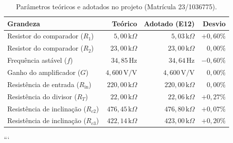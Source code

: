 \documentclass[11pt,a4paper]{article}
\begin{document}
\begin{table}[H]
\centering
\caption{Parâmetros teóricos e adotados no projeto (Matrícula 23/1036775).}
\label{tab:projeto_daniel}
\renewcommand{\arraystretch}{1.3}
\begin{tabular}{@{}lrrr@{}}
\toprule
\textbf{Grandeza} &
\textbf{Teórico} &
\textbf{Adotado (E12)} &
\textbf{Desvio}\\
\midrule
Resistor do comparador ($R_1$) &
$5{,}00\,\text{k}\Omega$ &
$5{,}03\,\text{k}\Omega$ &
$+0{,}60\%$\\

Resistor do comparador ($R_2$) &
$23{,}00\,\text{k}\Omega$ &
$23{,}00\,\text{k}\Omega$ &
$0{,}00\%$\\

Frequência astável ($f$) &
$34{,}85\,\text{Hz}$ &
$34{,}64\,\text{Hz}$ &
$-0{,}60\%$\\

Ganho do amplificador ($G$) &
$4{,}600\,\text{V/V}$ &
$4{,}600\,\text{V/V}$ &
$0{,}00\%$\\

Resistência de entrada ($R_{\text{in}}$) &
$220{,}00\,\text{k}\Omega$ &
$220{,}00\,\text{k}\Omega$ &
$0{,}00\%$\\

Resistência do divisor ($R_T$) &
$22{,}00\,\text{k}\Omega$ &
$22{,}06\,\text{k}\Omega$ &
$+0{,}27\%$\\

Resistência de inclinação ($R_{c2}$) &
$476{,}45\,\text{k}\Omega$ &
$476{,}80\,\text{k}\Omega$ &
$+0{,}07\%$\\

Resistência de inclinação ($R_{c3}$) &
$422{,}14\,\text{k}\Omega$ &
$423{,}00\,\text{k}\Omega$ &
$+0{,}20\%$\\
\bottomrule
\end{tabular}
\end{table}
```
\end{document}
